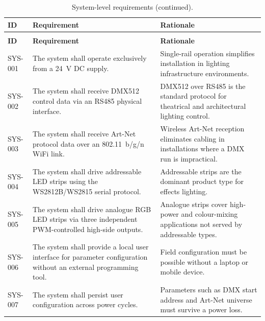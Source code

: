 \begin{longtable}{|p{1.8cm}|p{\dimexpr(\linewidth-1.8cm-6\tabcolsep-4\arrayrulewidth)/2\relax}|p{\dimexpr(\linewidth-1.8cm-6\tabcolsep-4\arrayrulewidth)/2\relax}|}
  \caption{System-level requirements.}\label{tab:req_system} \\
  \hline
  \textbf{ID} & \textbf{Requirement} & \textbf{Rationale} \\ \hline \hline
  \endfirsthead
  \caption[]{System-level requirements (continued).} \\
  \hline
  \textbf{ID} & \textbf{Requirement} & \textbf{Rationale} \\ \hline \hline
  \endhead
  \hline
  \endfoot
    \label{req:sys001}SYS-001 &
      The system shall operate exclusively from a \SI{24}{\volt} \ac{DC} supply. &
      Single-rail operation simplifies installation in lighting infrastructure environments. \\ \hline
    \label{req:sys002}SYS-002 &
      The system shall receive \ac{DMX}512 control data via an \ac{RS485} physical interface. &
      \ac{DMX}512 over \ac{RS485} is the standard protocol for theatrical and architectural lighting control. \\ \hline
    \label{req:sys003}SYS-003 &
      The system shall receive Art-Net protocol data over an 802.11~b/g/n \ac{WiFi} link. &
      Wireless Art-Net reception eliminates cabling in installations where a \ac{DMX} run is impractical. \\ \hline
    \label{req:sys004}SYS-004 &
      The system shall drive addressable \ac{LED} strips using the WS2812B/WS2815 serial protocol. &
      Addressable strips are the dominant product type for effects lighting. \\ \hline
    \label{req:sys005}SYS-005 &
      The system shall drive analogue \ac{RGB} \ac{LED} strips via three independent \ac{PWM}-controlled high-side outputs. &
      Analogue strips cover high-power and colour-mixing applications not served by addressable types. \\ \hline
    \label{req:sys006}SYS-006 &
      The system shall provide a local user interface for parameter configuration without an external programming tool. &
      Field configuration must be possible without a laptop or mobile device. \\ \hline
    \label{req:sys007}SYS-007 &
      The system shall persist user configuration across power cycles. &
      Parameters such as \ac{DMX} start address and Art-Net universe must survive a power loss. \\ \hline

\end{longtable}
